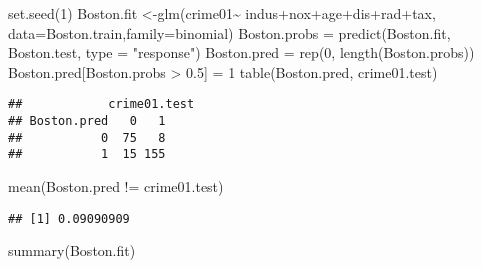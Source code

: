 \documentclass[
]{article}
\newenvironment{Shaded}{\begin{snugshade}}{\end{snugshade}}
\newcommand{\AttributeTok}[1]{\textcolor[rgb]{0.77,0.63,0.00}{#1}}
\newcommand{\DecValTok}[1]{\textcolor[rgb]{0.00,0.00,0.81}{#1}}
\newcommand{\FloatTok}[1]{\textcolor[rgb]{0.00,0.00,0.81}{#1}}
\newcommand{\FunctionTok}[1]{\textcolor[rgb]{0.00,0.00,0.00}{#1}}
\newcommand{\NormalTok}[1]{#1}
\newcommand{\OtherTok}[1]{\textcolor[rgb]{0.56,0.35,0.01}{#1}}
\newcommand{\SpecialCharTok}[1]{\textcolor[rgb]{0.00,0.00,0.00}{#1}}
\newcommand{\StringTok}[1]{\textcolor[rgb]{0.31,0.60,0.02}{#1}}
\begin{document}
\begin{Shaded}
\begin{Highlighting}[]
\FunctionTok{set.seed}\NormalTok{(}\DecValTok{1}\NormalTok{)}
\NormalTok{Boston.fit }\OtherTok{\textless{}{-}}\FunctionTok{glm}\NormalTok{(crime01}\SpecialCharTok{\textasciitilde{}}\NormalTok{ indus}\SpecialCharTok{+}\NormalTok{nox}\SpecialCharTok{+}\NormalTok{age}\SpecialCharTok{+}\NormalTok{dis}\SpecialCharTok{+}\NormalTok{rad}\SpecialCharTok{+}\NormalTok{tax, }\AttributeTok{data=}\NormalTok{Boston.train,}\AttributeTok{family=}\NormalTok{binomial)}
\NormalTok{Boston.probs }\OtherTok{=} \FunctionTok{predict}\NormalTok{(Boston.fit, Boston.test, }\AttributeTok{type =} \StringTok{"response"}\NormalTok{)}
\NormalTok{Boston.pred }\OtherTok{=} \FunctionTok{rep}\NormalTok{(}\DecValTok{0}\NormalTok{, }\FunctionTok{length}\NormalTok{(Boston.probs))}
\NormalTok{Boston.pred[Boston.probs }\SpecialCharTok{\textgreater{}} \FloatTok{0.5}\NormalTok{] }\OtherTok{=} \DecValTok{1}
\FunctionTok{table}\NormalTok{(Boston.pred, crime01.test)}
\end{Highlighting}
\end{Shaded}

\begin{verbatim}
##            crime01.test
## Boston.pred   0   1
##           0  75   8
##           1  15 155
\end{verbatim}

\begin{Shaded}
\begin{Highlighting}[]
\FunctionTok{mean}\NormalTok{(Boston.pred }\SpecialCharTok{!=}\NormalTok{ crime01.test)}
\end{Highlighting}
\end{Shaded}

\begin{verbatim}
## [1] 0.09090909
\end{verbatim}

\begin{Shaded}
\begin{Highlighting}[]
\FunctionTok{summary}\NormalTok{(Boston.fit)}
\end{Highlighting}
\end{Shaded}
\end{document}
